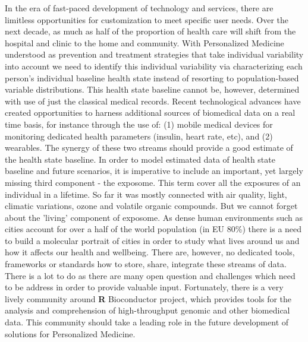 \documentclass[\main/boa.tex]{subfiles}
\begin{document}
In the era of fast-paced development of technology and services, there
are limitless opportunities for customization to meet specific user
needs. Over the next decade, as much as half of the proportion of health
care will shift from the hospital and clinic to the home and community.
With Personalized Medicine understood as prevention and treatment
strategies that take individual variability into account we need to
identify this individual variability via characterizing each person's
individual baseline health state instead of resorting to
population-based variable distributions. This health state baseline
cannot be, however, determined with use of just the classical medical
records. Recent technological advances have created opportunities to
harness additional sources of biomedical data on a real time basis, for
instance through the use of: (1) mobile medical devices for monitoring
dedicated health parameters (insulin, heart rate, etc), and (2)
wearables. The synergy of these two streams should provide a good
estimate of the health state baseline. In order to model estimated data
of health state baseline and future scenarios, it is imperative to
include an important, yet largely missing third component - the
exposome. This term cover all the exposures of an individual in a
lifetime. So far it was mostly connected with air quality, light,
climatic variations, ozone and volatile organic compounds. But we cannot
forget about the 'living' component of exposome. As dense human
environments such as cities account for over a half of the world
population (in EU 80\%) there is a need to build a molecular portrait of
cities in order to study what lives around us and how it affects our
health and wellbeing. There are, however, no dedicated tools, frameworks
or standards how to store, share, integrate these streams of data. There
is a lot to do as there are many open question and challenges which need
to be address in order to provide valuable input. Fortunately, there is
a very lively community around \textbf{R} Bioconductor project, which
provides tools for the analysis and comprehension of high-throughput
genomic and other biomedical data. This community should take a leading
role in the future development of solutions for Personalized Medicine.
\end{document}
